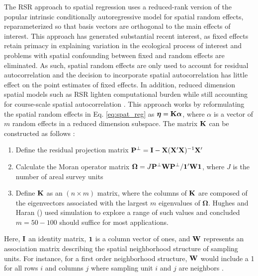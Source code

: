 \documentclass[12pt,fleqn]{article}
\begin{document}
\begin{flushleft}
\hspace{.5in}The RSR approach to spatial regression uses a reduced-rank version of the popular intrinsic conditionally autoregressive \citep[ICAR;][]{Besag1995,RueHeld2005} model for spatial random effects, reparameterized so that basis vectors are orthogonal to the main effects of interest.  This approach has generated substantial recent interest, as fixed effects retain primacy in explaining variation in the ecological process of interest and problems with spatial confounding between fixed and random effects are eliminated. As such, spatial random effects are only used to account for residual autocorrelation \citep{Reich2006,Hodges2010} and the decision to incorporate spatial autocorrelation has little effect on the point estimates of fixed effects.  In addition, reduced dimension spatial models such as RSR lighten computational burden while still accounting for course-scale spatial autocorrelation \citep[see e.g.][]{LatimerEtAl2009,Wikle2010,Hughes2013}.  This approach works by reformulating the spatial random effects in Eq. \ref{eq:spat_reg} as $\boldsymbol{\eta} = {\bf K} \boldsymbol{\alpha}$, where $\alpha$ is a vector of $m$ random effects in a reduced dimension subspace.
The matrix ${\bf K}$ can be constructed as follows \citep{Hughes2013}:
\begin{enumerate}
  \item Define the residual projection matrix ${\bf P}^\perp={\bf I}-{\bf X}({\bf X}^\prime{\bf X})^{-1}{\bf X}^\prime$
  \item Calculate the Moran operator matrix $\boldsymbol{\Omega}=J{\bf P}^\perp {\bf W}{\bf P}^\perp/{\bf 1}^\prime {\bf W} {\bf 1}$, where $J$ is the number of areal survey units
  \item Define ${\bf K}$ as an $(n \times m)$ matrix, where the columns of ${\bf K}$ are composed of the eigenvectors  associated with the largest $m$ eigenvalues of $\boldsymbol{\Omega}$. Hughes and Haran (\citeyear{Hughes2013}) used simulation to explore a range of such values and concluded $m=50-100$ should suffice for most applications.
\end{enumerate}
Here, ${\bf I}$ an identity matrix, ${\bf 1}$ is a column vector of ones, and ${\bf W}$ represents an association matrix describing the spatial neighborhood structure of sampling units.  For instance, for a first order neighborhood structure, ${\bf W}$ would include a 1 for all rows $i$ and columns $j$ where sampling unit $i$ and $j$ are neighbors \citep[see][for alternative association matrices]{RueHeld2005}.


\end{flushleft}
\end{document}
